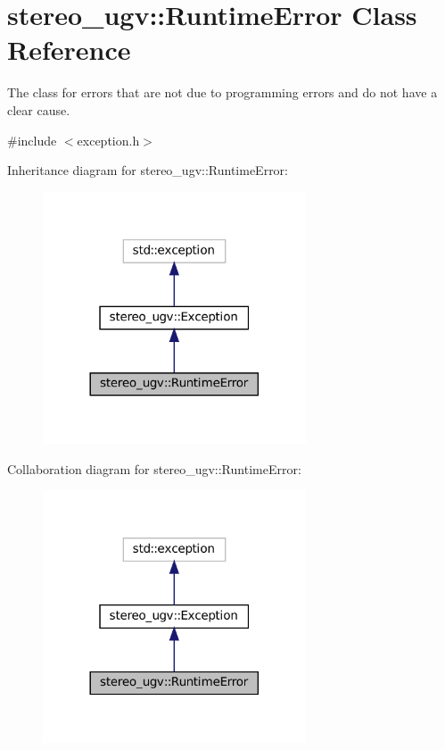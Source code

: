 \hypertarget{classstereo__ugv_1_1RuntimeError}{}\section{stereo\+\_\+ugv\+:\+:Runtime\+Error Class Reference}
\label{classstereo__ugv_1_1RuntimeError}


The class for errors that are not due to programming errors and do not have a clear cause.  




{\ttfamily \#include $<$exception.\+h$>$}



Inheritance diagram for stereo\+\_\+ugv\+:\+:Runtime\+Error\+:
\nopagebreak
\begin{figure}[H]
\begin{center}
\leavevmode
\includegraphics[width=221pt]{classstereo__ugv_1_1RuntimeError__inherit__graph}
\end{center}
\end{figure}


Collaboration diagram for stereo\+\_\+ugv\+:\+:Runtime\+Error\+:
\nopagebreak
\begin{figure}[H]
\begin{center}
\leavevmode
\includegraphics[width=221pt]{classstereo__ugv_1_1RuntimeError__coll__graph}
\end{center}
\end{figure}
